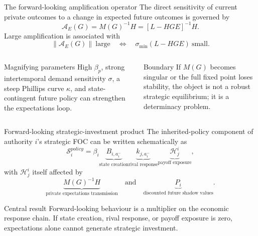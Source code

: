 \documentclass[10pt,aspectratio=169]{beamer}
\newcommand{\norm}[1]{\left\lVert#1\right\rVert}
\begin{document}
\begin{frame}{The forward-looking amplification operator}
The direct sensitivity of current private outcomes to a change in expected
future outcomes is governed by
\begin{equation*}
\boxed{\mathcal A_E(G)=M(G)^{-1}H=[L-HGE]^{-1}H.}
\end{equation*}
Large amplification is associated with
\begin{equation*}
\norm{\mathcal A_E(G)}\ \text{large}
\quad\Longleftrightarrow\quad
\sigma_{\min}(L-HGE)\ \text{small}.
\end{equation*}
\begin{columns}[T,onlytextwidth]
\begin{block}{Magnifying parameters}
High $\beta_p$, strong intertemporal demand sensitivity $\sigma$, a steep
Phillips curve $\kappa$, and state-contingent future policy can strengthen the
expectations loop.
\end{block}
\begin{alertblock}{Boundary}
If $M(G)$ becomes singular or the full fixed point loses stability, the object
is not a robust strategic equilibrium; it is a determinacy problem.
\end{alertblock}
\end{columns}
\end{frame}

\begin{frame}{Forward-looking strategic-investment product}
The inherited-policy component of authority $i$'s strategic FOC can be written
schematically as
\begin{equation*}
\boxed{
\mathcal S_i^{policy}
=\beta_i
\underbrace{B_{i,a_i^-}}_{\text{state creation}}
\underbrace{k_{j,a_i^-}}_{\text{rival response}}
\underbrace{\mathcal H^i_{j}}_{\text{payoff exposure}},}
\end{equation*}
with $\mathcal H^i_j$ itself affected by
\begin{equation*}
\underbrace{M(G)^{-1}H}_{\text{private expectations transmission}}
\quad\text{and}\quad
\underbrace{P_i}_{\text{discounted future shadow values}}.
\end{equation*}
\begin{alertblock}{Central result}
Forward-looking behaviour is a multiplier on the economic response chain. If
state creation, rival response, or payoff exposure is zero, expectations alone
cannot generate strategic investment.
\end{alertblock}
\end{frame}
\end{document}
